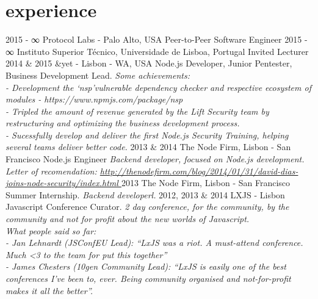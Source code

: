 \documentclass[]{friggeri-cv}
\begin{document}
\section{experience}

\begin{entrylist}
  \entry
    {2015 - ∞ }
    {Protocol Labs - Palo Alto, USA}
    {Peer-to-Peer Software Engineer}
    {\emph{}}
  \entry
    {2015 - ∞ }
    {Instituto Superior Técnico, Universidade de Lisboa, Portugal}
    {Invited Lecturer}
    {\emph{}}
  \entry
    {2014 \& 2015}
    {\&yet - Lisbon -  WA, USA}
    {Node.js Developer, Junior Pentester, Business Development Lead.}
    {\emph{Some achievements:\\
        - Development the `nsp'vulnerable dependency checker and respective ecosystem of modules - https://www.npmjs.com/package/nsp\\
        - Tripled the amount of revenue generated by the Lift Security team by restructuring and optimizing the business development process.\\
        - Sucessfully develop and deliver the first Node.js Security Training, helping several teams deliver better code.}}
  \entry
    {2013 \& 2014}
    {The Node Firm, Lisbon - San Francisco}
    {Node.js Engineer}
    {\emph{Backend developer, focused on Node.js development. Letter of recomendation: \href{http://thenodefirm.com/blog/2014/01/31/david-dias-joins-node-security/index.html}{http://thenodefirm.com/blog/2014/01/31/david-dias-joins-node-security/index.html }}}
  \entry
    {2013}
    {The Node Firm, Lisbon - San Francisco}
    {Summer Internship.}
    {\emph{Backend developerl.}}
  \entry
  {2012, 2013 \& 2014}
    {LXJS - Lisbon Javascript Conference}
    {Curator.}
    {\emph{2 day conference, for the community, by the community and not for profit about the new worlds of Javascript.\\
    What people said so far: \\
      - Jan Lehnardt (JSConfEU Lead): “LxJS was a riot. A must-attend conference. Much <3 to the team for put this together”\\
      - James Chesters (10gen Community Lead): “LxJS is easily one of the best conferences I’ve been to, ever. Being community  organised and not-for-profit makes it all the better”.}}
\end{entrylist}
\end{document}
